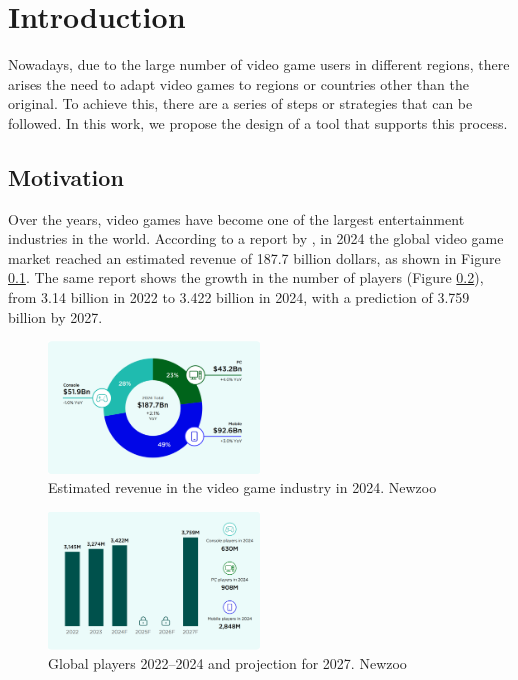 \chapter*{Introduction}
\label{cap:introduction}


Nowadays, due to the large number of video game users in different regions, there arises the need to adapt video games to regions or countries other than the original. To achieve this, there are a series of steps or strategies that can be followed. In this work, we propose the design of a tool that supports this process.

\section{Motivation}
Over the years, video games have become one of the largest entertainment industries in the world. According to a report by \cite{NZIngreso2024}, in 2024 the global video game market reached an estimated revenue of 187.7 billion dollars, as shown in Figure \ref{fig:NewZooRevenues_E}. The same report shows the growth in the number of players (Figure \ref{fig:NewzooPlayers_E}), from 3.14 billion in 2022 to 3.422 billion in 2024, with a prediction of 3.759 billion by 2027.

\begin{figure}[H]
	\centering
	\includegraphics[width = 0.5\textwidth]{Imagenes/Newzoo_2024_Revenues.png}
	\caption{Estimated revenue in the video game industry in 2024. Newzoo}
	\label{fig:NewZooRevenues_E}
\end{figure}

\begin{figure}[H]
	\centering
	\includegraphics[width = 0.5\textwidth]{Imagenes/Newzoo_Players.png}
	\caption{Global players 2022–2024 and projection for 2027. Newzoo}
	\label{fig:NewzooPlayers_E}
\end{figure}


